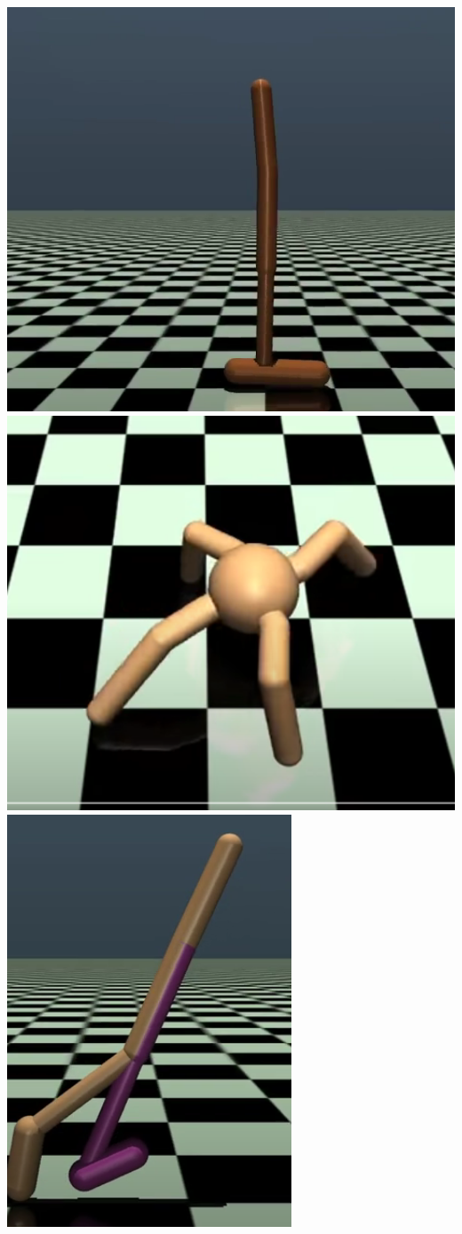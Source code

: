 \begin{frame}
    \includegraphics[width=.3\textwidth, height=0.4\textheight]{figures/rllab/Hopper.PNG}\hfill
    \includegraphics[width=.3\textwidth, height=0.4\textheight]{figures/rllab/antv2.PNG}\hfill
    \includegraphics[width=.3\textwidth, height=0.4\textheight]{figures/rllab/walker.PNG}\hfill \\
    \cite{picturesrllab}
\end{frame}


